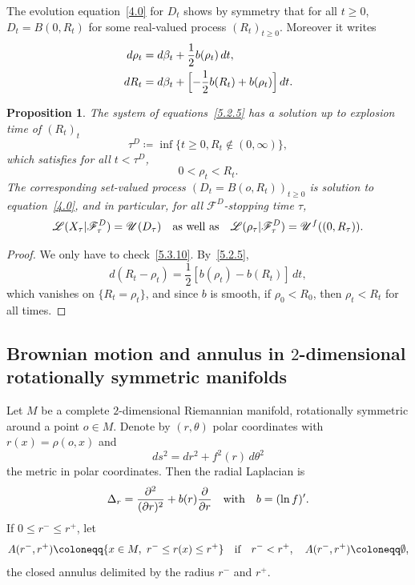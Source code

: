 \documentclass[10pt]{amsart}
\theoremstyle{plain}
\newtheorem{prop}[thm]{Proposition}
\theoremstyle{definition}
\newcommand{\SF}{{\mathscr F}}
\newcommand{\SL}{{\mathscr L}}
\newcommand{\SU}{{\mathscr U}}
\newcommand\df{\coloneqq}
\let\f\frac
\let\b\beta
\begin{document}
The evolution equation~\eqref{4.0} for $D_t$ shows by symmetry that for all $t\ge 0$, $D_t=B(0,R_t)$ for some real-valued process $(R_t)_{t\ge0}$. Moreover it writes
\begin{equation}
\label{5.2.5}
\begin{split}
d\rho_t&=d\b_t+\f12 b(\rho_t)\,dt,\\
dR_t&= d\beta_t+\Bigl[-\f12 b(R_t)+b(\rho_t)\Bigr]\,dt.
\end{split}
\end{equation}
\begin{prop}
\label{P5.2.1}
The system of equations~\eqref{5.2.5} has a solution up to explosion time of $(R_t)_t$
\begin{equation}
\tau^D\df \inf\{t\ge 0, R_t\not\in (0,\infty)\},
\end{equation}
which satisfies for all $t<\tau^D$,
\begin{equation}
\label{5.3.10}
0< \rho_t< R_t.
\end{equation}
The corresponding set-valued process $(D_t=B(o,R_t))_{t\ge0}$ is solution to equation~\eqref{4.0}, and in particular, for all $\SF^D$-stopping time $\tau$,
\begin{equation}
\SL(X_\tau|\SF_\tau^D)=\SU(D_\tau)\quad\hbox{as well as}\quad \SL(\rho_\tau|\SF_\tau^D)=\SU^f((0,R_\tau)).
\end{equation}
\end{prop}
\begin{proof}
We only have to check~\eqref{5.3.10}. By~\eqref{5.2.5},
\begin{equation}
d(R_t-\rho_t)=\f12\left[b(\rho_t)-b(R_t)\right]\,dt,
\end{equation}
which vanishes on $\{R_t=\rho_t\}$, and since $b$ is smooth, if $\rho_0<R_0$, then $\rho_t<R_t$ for all times.
\end{proof}
\subsection{Brownian motion and annulus in $2$-dimensional rotationally symmetric manifolds}
\label{Subsection5.3}

Let $M$ be a complete $2$-dimensional Riemannian manifold, rotationally symmetric around a point $o\in M$. Denote by $(r,\theta)$ polar coordinates with $r(x)=\rho(o,x)$ and
\begin{equation}
ds^2=dr^2+f^2(r)\,d\theta^2
\end{equation}
the metric in polar coordinates. Then the radial Laplacian is
\begin{equation}
\Delta_r=\f{\partial^2}{(\partial r)^2} +b(r)\f{\partial}{\partial r}\quad\hbox{with}\quad b=(\ln f)'.
\end{equation}
If $0\le r^-\le r^+$, let
\begin{equation}
A(r^-,r^+) \df \{x\in M,\ r^-\leq r(x)\leq r^+\}\quad\hbox{if}\quad r^-<r^+, \quad A(r^-,r^+)\df\emptyset,
\end{equation}
the closed annulus delimited by the radius $r^-$ and $r^+$.
\end{document}
